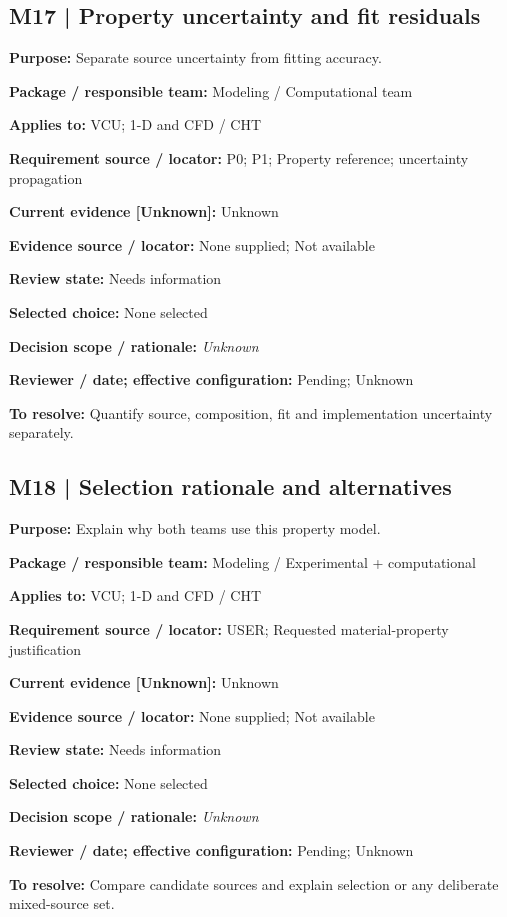 \documentclass[11pt]{article}
\begin{document}
\begin{minipage}{\textwidth}\small\setlength{\parskip}{2pt}
\subsection*{M17 | Property uncertainty and fit residuals}
\textbf{Purpose:} Separate source uncertainty from fitting accuracy.\par
\textbf{Package / responsible team:} Modeling / Computational team\par
\textbf{Applies to:} VCU; 1-D and CFD / CHT\par
\textbf{Requirement source / locator:} P0; P1; Property reference; uncertainty propagation\par
\textbf{Current evidence [Unknown]:} Unknown\par
\textbf{Evidence source / locator:} None supplied; Not available\par
\textbf{Review state:} Needs information\par
\textbf{Selected choice:} None selected\par
\textbf{Decision scope / rationale:} \textit{Unknown}\par
\textbf{Reviewer / date; effective configuration:} Pending; Unknown\par
\textbf{To resolve:} Quantify source, composition, fit and implementation uncertainty separately.\par
\end{minipage}\par\vspace{5pt}
\begin{minipage}{\textwidth}\small\setlength{\parskip}{2pt}
\subsection*{M18 | Selection rationale and alternatives}
\textbf{Purpose:} Explain why both teams use this property model.\par
\textbf{Package / responsible team:} Modeling / Experimental + computational\par
\textbf{Applies to:} VCU; 1-D and CFD / CHT\par
\textbf{Requirement source / locator:} USER; Requested material-property justification\par
\textbf{Current evidence [Unknown]:} Unknown\par
\textbf{Evidence source / locator:} None supplied; Not available\par
\textbf{Review state:} Needs information\par
\textbf{Selected choice:} None selected\par
\textbf{Decision scope / rationale:} \textit{Unknown}\par
\textbf{Reviewer / date; effective configuration:} Pending; Unknown\par
\textbf{To resolve:} Compare candidate sources and explain selection or any deliberate mixed-source set.\par
\end{minipage}\par\vspace{5pt}
\end{document}
